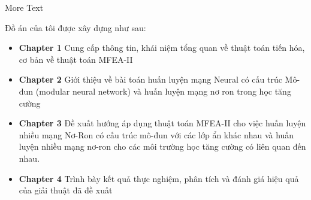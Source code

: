 More Text

Đồ án của tôi được xây dựng như sau:
\begin{itemize}
  \item \textbf{Chapter 1} Cung cấp thông tin, khái niệm tổng quan về thuật toán tiến hóa, cơ bản về thuật toán MFEA-II
  \item \textbf{Chapter 2} Giới thiệu về bài toán huấn luyện mạng Neural có cấu trúc Mô-đun (modular neural network) và huấn luyện mạng nơ ron trong học tăng cường
  \item \textbf{Chapter 3} Đề xuất hướng áp dụng thuật toán MFEA-II cho việc huấn luyện nhiều mạng Nơ-Ron có cấu trúc mô-đun với các lớp ẩn khác nhau và huấn luyện nhiều mạng nơ-ron cho các môi trường học tăng cường có liên quan đến nhau.
  \item \textbf{Chapter 4} Trình bày kết quả thực nghiệm, phân tích và đánh giá hiệu quả của giải thuật đã đề xuất
\end{itemize}

\pagebreak
